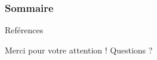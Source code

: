 \documentclass[notes,handout,compress]{beamer}
\begin{document}


\begin{frame}
  \frametitle{Sommaire}
  \tableofcontents
\end{frame}








% 

% 




\appendix   %


\begin{frame}[plain,t]{Reférences}
  \tiny
  \printbibliography
\end{frame}


  \begin{frame}[plain]
    \Large
    \begin{exampleblock}{\centering \LARGE Merci pour votre attention \Large \Smiley{} !}\LARGE
      \centering
      Questions ?
    \end{exampleblock}

  \end{frame}
\end{document}
